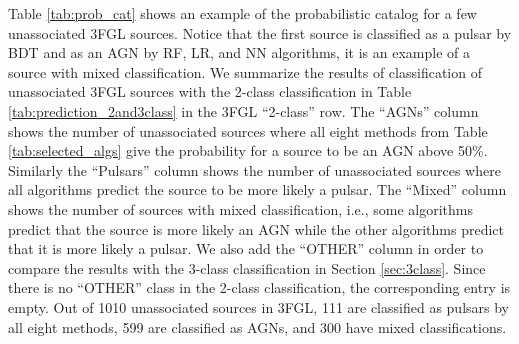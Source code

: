 \begin{table}[!h]
    \vspace{0.2cm}
    \caption{Expected number of AGNs, pulsars, and other sources as well as sources with mixed classifications
    among the unassociated 3FGL and 4FGL-DR2 sources derived with the 2-class (Section \ref{sec:prob_cats}) 
    and 3-class (Section \ref{sec:3class}) classification.
    The ``2-class corr'' row shows correction of the 2-class classification prediction due to the presence of OTHER sources among 
    the unassociated ones (see Section \ref{sec:3FGLprediction1} for details).}
    \label{tab:prediction_2and3class}
\end{table}


Table \ref{tab:prob_cat} shows an example of the probabilistic catalog for a few unassociated 3FGL sources.
Notice that the first source is classified as a pulsar by BDT and as an AGN by RF, LR, and NN algorithms,
it is an example of a source with mixed classification.
We summarize the results of classification of unassociated 3FGL sources with the 2-class classification 
in Table \ref{tab:prediction_2and3class} in the 3FGL ``2-class'' row.
The ``AGNs'' column shows the number of unassociated sources where all eight methods from Table \ref{tab:selected_algs} 
give the probability for a source to be an AGN above 50\%.
Similarly the ``Pulsars'' column shows the number of unassociated sources where all algorithms predict the source to be more likely a pulsar.
The ``Mixed'' column shows the number of sources with mixed classification, i.e., some algorithms predict that the source is more likely an AGN while the other algorithms predict that it is more likely a pulsar.
We also add the ``OTHER'' column in order to compare the results with the 3-class classification in Section \ref{sec:3class}.
Since there is no ``OTHER'' class in the 2-class classification, the corresponding entry is empty.
Out of 1010 unassociated sources in 3FGL, 111 are classified as pulsars by all eight methods, 599 are classified as AGNs, and 300 have mixed classifications.



